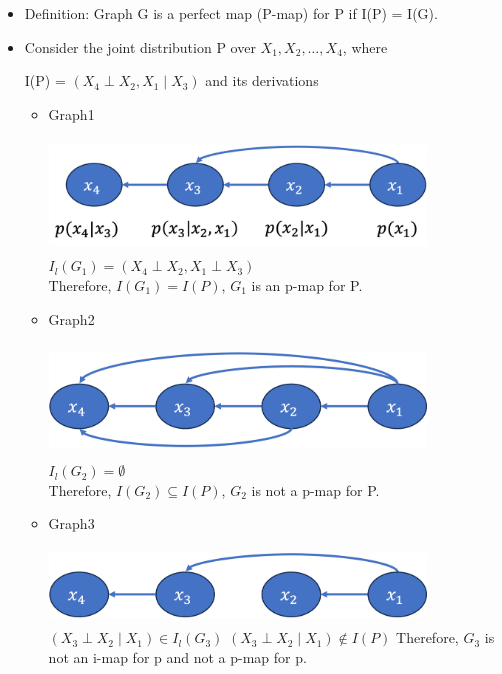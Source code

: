 \documentclass[11pt,a4paper]{report}
\begin{document}
\begin{itemize}
    \item Definition: Graph G is a perfect map (P-map) for P if I(P) = I(G).
    \item Consider the joint distribution P over $X_{1}, X_{2}, \ldots, X_{4}$, where
    \begin{center}
        I(P) =  {$(X_{4} \perp X_{2}, X_{1} \mid X_{3})$ and its derivations}
    \end{center}
    \begin{itemize}
        \item Graph1
        
        \includegraphics[width = 10cm, height = 3cm]{graph_vis.png}\\
        $I_{l}(G_{1}) = {(X_{4} \perp X_{2}, X_{1} \perp X_{3})}$\\
        Therefore, $I(G_{1}) = I(P)$, $G_{1}$ is an p-map for P.

        \item Graph2
        
        \includegraphics[width = 10cm, height = 3cm]{graph_vis2.png}\\
        $I_{l}(G_{2}) = \emptyset $\\
        Therefore, $I(G_{2}) \subseteq I(P)$, $G_{2}$ is not a p-map for P.

        \item Graph3
        
        \includegraphics[width = 10cm, height = 2cm]{imap_1.png}\\
        $(X_{3} \perp X_{2} \mid X_{1}) \in I_{l}(G_{3})$
        $(X_{3} \perp X_{2} \mid X_{1}) \notin I(P)$
        Therefore, $G_{3}$ is not an i-map for p and not a p-map for p.
    \end{itemize}
\end{itemize}
\end{document}
